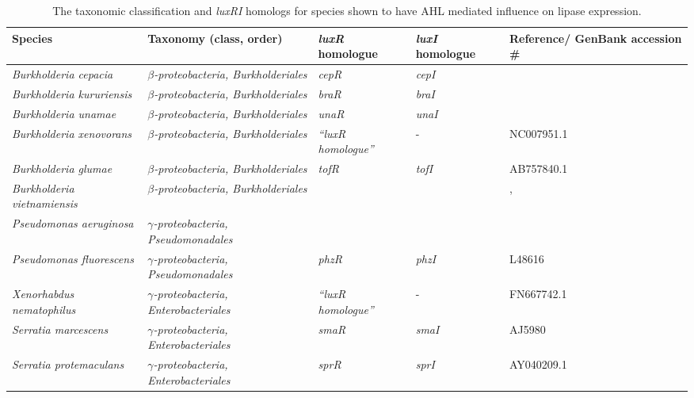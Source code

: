 \documentclass[11pt]{article}
\begin{document}
\begin{table}
\caption{The taxonomic classification and \emph{luxRI} homologs for species shown to have AHL mediated influence on lipase expression.}
\begin{tabular}{ | p{2.5cm} | p{3cm} | p{1.5cm} | p{1.5cm} | p{2.5cm} | }
\hline
Species & Taxonomy (class, order) & \emph{luxR} homologue & \emph{luxI} homologue & Reference/ GenBank accession \# \\
\hline
\emph{Burkholderia cepacia} & \emph{$\beta$-proteobacteria, Burkholderiales} & \emph{cepR} & \emph{cepI} & \cite{lewenza1999} \\
\hline
\emph{Burkholderia kururiensis} & \emph{$\beta$-proteobacteria, Burkholderiales} & \emph{braR} & \emph{braI} & \cite{suarez2008} \\
\hline
\emph{Burkholderia unamae} & \emph{$\beta$-proteobacteria, Burkholderiales} & \emph{unaR} & \emph{unaI} & \cite{suarez2010} \\
\hline
\emph{Burkholderia xenovorans} & \emph{$\beta$-proteobacteria, Burkholderiales} & \emph{“luxR homologue”} & - & NC007951.1 \\
\hline
\emph{Burkholderia glumae} & \emph{$\beta$-proteobacteria, Burkholderiales} & \emph{tofR} & \emph{tofI} & AB757840.1 \\
\hline
\emph{Burkholderia vietnamiensis} & \emph{$\beta$-proteobacteria, Burkholderiales} & \emph{} & \emph{} & \cite{conway_02}, \cite{ulrich2004}
 \\
\hline
\emph{Pseudomonas aeruginosa} & \emph{$\gamma$-proteobacteria, Pseudomonadales} & \emph{} & \emph{} & \cite{juhas2005} \\
\hline
\emph{Pseudomonas fluorescens} & \emph{$\gamma$-proteobacteria, Pseudomonadales} & \emph{phzR} & \emph{phzI} & L48616 \\
\hline
\emph{Xenorhabdus nematophilus} & \emph{$\gamma$-proteobacteria, Enterobacteriales} & \emph{“luxR homologue”} & - & FN667742.1 \\
\hline
\emph{Serratia marcescens} & \emph{$\gamma$-proteobacteria, Enterobacteriales} & \emph{smaR} & \emph{smaI} & AJ5980 \\
\hline
\emph{Serratia protemaculans} & \emph{$\gamma$-proteobacteria, Enterobacteriales} & \emph{sprR} & \emph{sprI} & AY040209.1 \\
\hline
\end{tabular}
\end{table}
\end{document}
